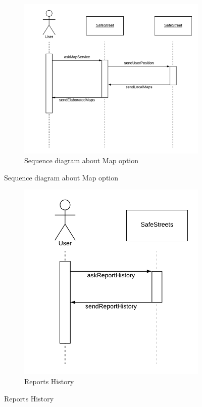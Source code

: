 \documentclass[12pt,a4paper]{report}
\begin{document}
				\begin{figure}[H]
					\begin{subfigure}{\textwidth}
						\includegraphics[scale = 0.70, center]{MapSequenceDiagram}
						\caption{Sequence diagram about Map option}
					\end{subfigure}
				\end{figure}
				\begin{figure}[H]
					\begin{subfigure}{\textwidth}
						\includegraphics[scale = 0.70, center]{HhistorySequenceDiagram}
						\caption{Reports History}
					\end{subfigure}
				\end{figure}	
\end{document}
